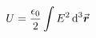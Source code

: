 

\vspace*{\fill}
\centering

\begin{align*}
    U = \frac{\epsilon_0}{2} \int E^2 \dd[3]{\va*{r}}
\end{align*}

\centering
\vspace*{\fill}


